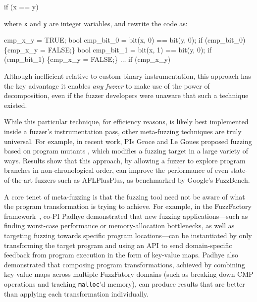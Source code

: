 \begin{code}

if (x == y)
\end{code}

\noindent where {\tt x} and {\tt y} are integer variables, and rewrite the code 
as:

\begin{code}
cmp\_x\_y = TRUE;
bool cmp\_bit\_0 = bit(x, 0) == bit(y, 0);
if (cmp\_bit\_0) \{cmp\_x\_y = FALSE;\}
bool cmp\_bit\_1 = bit(x, 1) == bit(y, 0);
if (cmp\_bit\_1) \{cmp\_x\_y = FALSE;\}
$\ldots$
if (cmp\_x\_y)
\end{code}

\noindent Although inefficient relative to custom binary instrumentation, this
approach has the key advantage it enables \emph{any fuzzer} to make use of the power of 
decomposition, even if the fuzzer developers were unaware that such a technique 
existed. 

While this particular technique, for efficiency reasons, is likely best 
implemented inside a fuzzer's instrumentation pass, other meta-fuzzing 
techniques are truly universal.  For example, in recent work, PIs Groce and Le Goues 
proposed fuzzing based on program mutants \cite{}, which modifies a fuzzing 
target in a large variety of ways.  Results show that this approach, by 
allowing a fuzzer to explore program branches in non-chronological order, can 
improve the performance of even state-of-the-art fuzzers such as AFLPlusPlus, 
as benchmarked by Google's FuzzBench.

A core tenet of meta-fuzzing is that the fuzzing tool need not be aware of what 
the program transformation is trying to achieve. For example, in the 
FuzzFactory framework~\cite{fuzzfactory}, co-PI Padhye demonstrated that new 
fuzzing applications---such as finding worst-case performance or 
memory-allocation bottlenecks, as well as targeting fuzzing towards specific 
program locations---can be instantiated by only transforming the target program 
and using an API to send domain-specific feedback from program execution in the 
form of key-value maps. Padhye also demonstrated that composing program 
transformations, achieved by combining key-value maps across multiple 
FuzzFatory domains (such as breaking down CMP operations and tracking 
\texttt{malloc}'d memory), can produce results that are better than applying 
each transformation individually.


